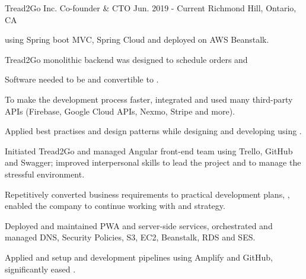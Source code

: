 \begin{cventries}
  \cventry
    {Tread2Go Inc.} %
    {Co-founder \& CTO} %
    {Jun. 2019 - Current} %
    {Richmond Hill, Ontario, CA} %
    {
      \begin{cvitems} %
        \item { using Spring boot MVC, Spring Cloud and deployed on AWS Beanstalk.}
          \begin{cvsubitems}
            \item {Tread2Go monolithic backend was designed to schedule orders and }
            \item {Software needed to be  and convertible to .}
            \item {To make the development process faster, integrated and used many third-party APIs (Firebase, Google Cloud APIs, Nexmo, Stripe and more).}
            \item {Applied best practises and design patterns while designing and developing  using .}
          \end{cvsubitems}
        \item {Initiated Tread2Go  and managed Angular front-end team using Trello, GitHub and Swagger; improved interpersonal skills to lead the project and  to manage the stressful environment.}
          \begin{cvsubitems}
            \item {Repetitively converted business requirements to practical development plans, , enabled the company to continue working with  and  strategy.}
          \end{cvsubitems}
        \item {Deployed and maintained PWA and server-side services, orchestrated and managed DNS, Security Policies, S3, EC2, Beanstalk, RDS and SES.}
          \begin{cvsubitems}
            \item {Applied and setup  and development pipelines using Amplify and GitHub, significantly eased .}
          \end{cvsubitems}
      \end{cvitems}
    }


\end{cventries}
